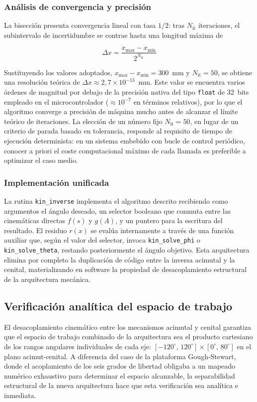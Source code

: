\subsubsection{Análisis de convergencia y precisión}
La bisección presenta convergencia lineal con tasa $1/2$: tras $N_{\text{it}}$ iteraciones, el subintervalo de incertidumbre se contrae hasta una longitud máxima de

\begin{equation}
    \Delta x = \frac{x_{\max} - x_{\min}}{2^{N_{\text{it}}}}
    \label{eq:precision_biseccion}
\end{equation}

Sustituyendo los valores adoptados, $x_{\max} - x_{\min} = 300$~mm y $N_{\text{it}} = 50$, se obtiene una resolución teórica de $\Delta x \approx 2{,}7 \times 10^{-13}$~mm. Este valor se encuentra varios órdenes de magnitud por debajo de la precisión nativa del tipo \texttt{float} de 32~bits empleado en el microcontrolador ($\approx 10^{-7}$ en términos relativos), por lo que el algoritmo converge a precisión de máquina mucho antes de alcanzar el límite teórico de iteraciones. La elección de un número fijo $N_{\text{it}}=50$, en lugar de un criterio de parada basado en tolerancia, responde al requisito de tiempo de ejecución determinista: en un sistema embebido con bucle de control periódico, conocer a priori el coste computacional máximo de cada llamada es preferible a optimizar el caso medio.

\subsubsection{Implementación unificada}
La rutina \texttt{kin\_inverse} implementa el algoritmo descrito recibiendo como argumentos el ángulo deseado, un selector booleano que conmuta entre las cinemáticas directas $f(s)$ y $g(A)$, y un puntero para la escritura del resultado. El residuo $r(x)$ se evalúa internamente a través de una función auxiliar que, según el valor del selector, invoca \texttt{kin\_solve\_phi} o \texttt{kin\_solve\_theta}, restando posteriormente el ángulo objetivo. Esta arquitectura elimina por completo la duplicación de código entre la inversa acimutal y la cenital, materializando en software la propiedad de desacoplamiento estructural de la arquitectura mecánica.

\subsection{Verificación analítica del espacio de trabajo}
El desacoplamiento cinemático entre los mecanismos acimutal y cenital garantiza que el espacio de trabajo combinado de la arquitectura sea el producto cartesiano de los rangos angulares individuales de cada eje: $[-120^{\circ},\,120^{\circ}] \times [0^{\circ},\,80^{\circ}]$ en el plano acimut-cenital. A diferencia del caso de la plataforma Gough-Stewart, donde el acoplamiento de los seis grados de libertad obligaba a un mapeado numérico exhaustivo para determinar el espacio alcanzable, la separabilidad estructural de la nueva arquitectura hace que esta verificación sea analítica e inmediata.

